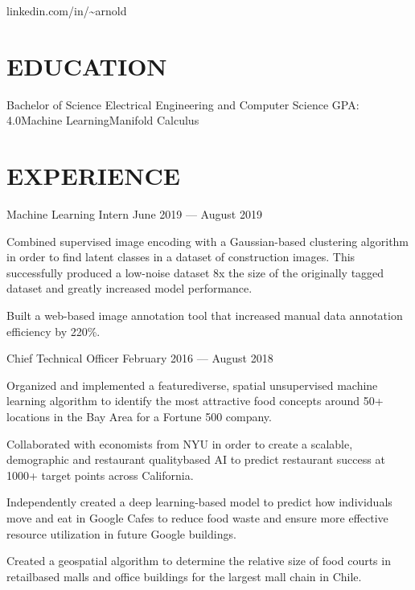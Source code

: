 \documentclass[10pt]{article}
\begin{document}
				 {linkedin.com/in/{\textasciitilde}arnold}      

\section*{EDUCATION}

    {Bachelor of Science {\textendash} Electrical Engineering and Computer Science}
{GPA: 4.0}{Machine Learning}{Manifold Calculus}


\section*{EXPERIENCE}

                {Machine Learning Intern}
                {June 2019 --- August 2019}
                    \begin{accomplishments}
                        \item Combined supervised image encoding with a Gaussian-based clustering algorithm in order to find latent classes in a dataset of construction images. 
                          This successfully produced a low-noise dataset 8x the size of the originally tagged dataset and greatly increased model performance.
                        \item Built a web-based image annotation tool that increased manual data annotation efficiency by 220\%.
                    \end{accomplishments}

								{Chief Technical Officer}
								{February 2016 --- August 2018}                  		
	                   \begin{accomplishments} 
	                    		\item Organized and implemented a feature{\textendash}diverse, spatial unsupervised machine learning algorithm to identify the most attractive food concepts around 50+ locations in the Bay Area for a Fortune 500 company.
	                    		\item Collaborated with economists from NYU in order to create a scalable, demographic and restaurant quality{\textendash}based AI to predict restaurant success at 1000+ target points across California.
	                    		\item Independently created a deep learning-based model to predict how individuals move and eat in Google Cafes to reduce food waste and ensure more effective resource utilization in future Google buildings.
	                    		\item Created a geospatial algorithm to determine the relative size of food courts in retail{\textendash}based malls and office buildings for the largest mall chain in Chile.
	                    \end{accomplishments}
	                    		
\end{document}
